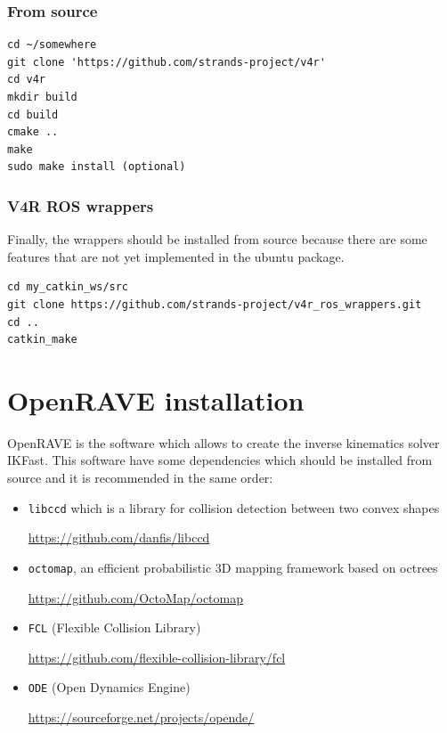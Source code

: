\documentclass[12pt,a4paper,final,twoside,openright]{report}
\begin{document}
\subsubsection{From source}

\begin{lstlisting}[language=Git]
cd ~/somewhere
git clone 'https://github.com/strands-project/v4r'
cd v4r
mkdir build
cd build
cmake ..
make
sudo make install (optional)
\end{lstlisting}

\subsubsection{V4R ROS wrappers}

Finally, the wrappers should be installed from source because there are some features that are not yet implemented in the ubuntu package.

\begin{lstlisting}[language=Git]
cd my_catkin_ws/src
git clone https://github.com/strands-project/v4r_ros_wrappers.git
cd ..
catkin_make
\end{lstlisting}

\section{OpenRAVE installation}
\label{app:ikfast}

OpenRAVE is the software which allows to create the inverse kinematics solver IKFast. This software have some dependencies which should be installed from source and it is recommended in the same order:

\begin{itemize}
\item \texttt{libccd} which is a library for collision detection between two convex shapes

\url{https://github.com/danfis/libccd}

\item \texttt{octomap}, an efficient probabilistic 3D mapping framework based on octrees

\url{https://github.com/OctoMap/octomap}

\item \texttt{FCL} (Flexible Collision Library)

\url{https://github.com/flexible-collision-library/fcl}

\item \texttt{ODE} (Open Dynamics Engine)

\url{https://sourceforge.net/projects/opende/}
\end{itemize}
\end{document}

